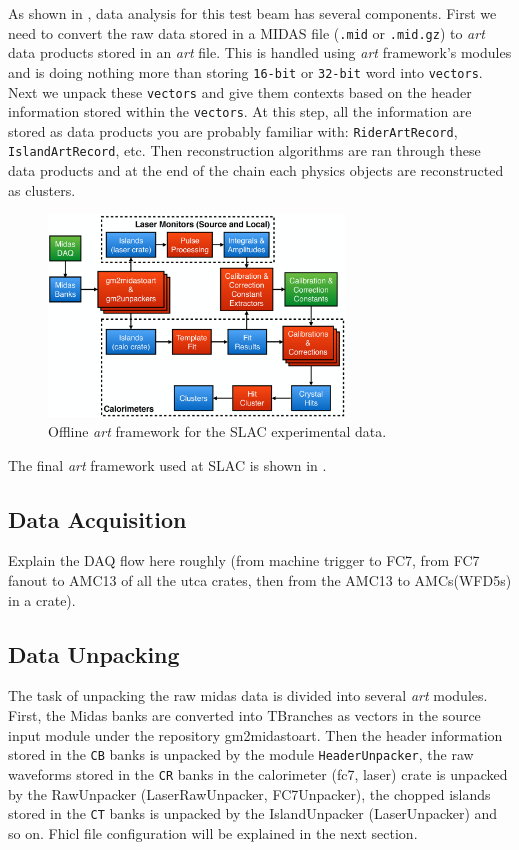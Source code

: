 As shown in , data analysis for this test beam has several components. First we need to convert the raw data stored in a MIDAS file (\verb+.mid+ or \verb+.mid.gz+) to \textit{art} data products stored in an \textit{art} file.
This is handled using \textit{art} framework's modules and is doing nothing more than storing \verb+16-bit+ or \verb+32-bit+ word into \verb+vectors+. Next we unpack these \verb+vectors+
and give them contexts based on the header information stored within the \verb+vectors+. At this step, all the information are stored as data products you are probably familiar with: \verb+RiderArtRecord+,
\verb+IslandArtRecord+, etc. Then reconstruction algorithms are ran through these data products and at the end of the chain each physics objects are reconstructed as clusters.
%
\begin{figure}[htbp]
\centering
\includegraphics[width=0.7\textwidth]{pics/offline_slac_art_framework}
\caption{Offline \textit{art} framework for the SLAC experimental data.}
\label{pic:art_framework}
\end{figure}
%
The final \textit{art} framework used at SLAC is shown in .

\subsection{Data Acquisition}
Explain the DAQ flow here roughly (from machine trigger to FC7, from FC7 fanout to AMC13 of all the \ac{utca} crates, then from the AMC13 to AMCs(WFD5s) in a crate).

\subsection{Data Unpacking}
The task of unpacking the raw midas data is divided into several \textit{art} modules. First, the Midas banks are converted into TBranches as vectors in the source input module under the repository gm2midastoart.
Then the header information stored in the \verb+CB+ banks is unpacked by the module \verb+HeaderUnpacker+, 
the raw waveforms stored in the \verb+CR+ banks in the calorimeter (fc7, laser) crate is unpacked by the RawUnpacker (LaserRawUnpacker, FC7Unpacker), the chopped islands stored in the \verb+CT+ banks
is unpacked by the IslandUnpacker (LaserUnpacker) and so on. Fhicl file configuration will be explained in the next section.

